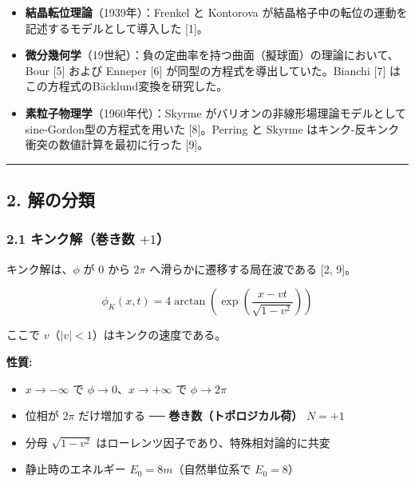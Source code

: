 \documentclass[a4paper,11pt]{ltjsarticle}
\providecommand{\tightlist}{\setlength{\itemsep}{0pt}\setlength{\parskip}{0pt}}
\begin{document}
\begin{itemize}
\tightlist
\item
  \textbf{結晶転位理論}（1939年）：Frenkel と Kontorova
  が結晶格子中の転位の運動を記述するモデルとして導入した {[}1{]}。
\item
  \textbf{微分幾何学}（19世紀）：負の定曲率を持つ曲面（擬球面）の理論において、Bour
  {[}5{]} および Enneper {[}6{]} が同型の方程式を導出していた。Bianchi
  {[}7{]} はこの方程式のBäcklund変換を研究した。
\item
  \textbf{素粒子物理学}（1960年代）：Skyrme
  がバリオンの非線形場理論モデルとして sine-Gordon型の方程式を用いた
  {[}8{]}。Perring と Skyrme
  はキンク-反キンク衝突の数値計算を最初に行った {[}9{]}。
\end{itemize}

\begin{center}\rule{0.5\linewidth}{0.5pt}\end{center}

\subsection{2. 解の分類}\label{ux89e3ux306eux5206ux985e}

\subsubsection{\texorpdfstring{2.1 キンク解（巻き数
\(+1\)）}{2.1 キンク解（巻き数 +1）}}\label{ux30adux30f3ux30afux89e3ux5dfbux304dux6570-1}

キンク解は、\(\phi\) が \(0\) から \(2\pi\)
へ滑らかに遷移する局在波である {[}2, 9{]}。

\[\phi_K(x, t) = 4\arctan\left(\exp\left(\frac{x - vt}{\sqrt{1 - v^2}}\right)\right)\]

ここで \(v\)（\(|v| < 1\)）はキンクの速度である。

\textbf{性質:}

\begin{itemize}
\tightlist
\item
  \(x \to -\infty\) で \(\phi \to 0\)、\(x \to +\infty\) で
  \(\phi \to 2\pi\)
\item
  位相が \(2\pi\) だけ増加する ── \textbf{巻き数（トポロジカル荷）}
  \(N = +1\)
\item
  分母 \(\sqrt{1 - v^2}\) はローレンツ因子であり、特殊相対論的に共変
\item
  静止時のエネルギー \(E_0 = 8m\)（自然単位系で \(E_0 = 8\)）
\end{itemize}
\end{document}
